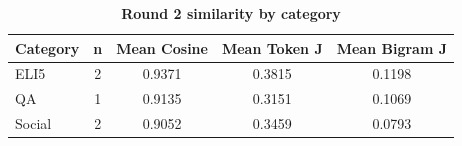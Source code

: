 \begin{table}[htbp]
\centering
\caption{\textbf{Round 2 similarity by category}}
\label{tab:round2-similarity-by-category}
\renewcommand{\arraystretch}{1.4}
\begin{tabular}{|l|c|c|c|c|}
\hline
\textbf{Category} & \textbf{n} & \textbf{Mean Cosine} & \textbf{Mean Token J} & \textbf{Mean Bigram J} \\
\hline
ELI5 & 2 & 0.9371 & 0.3815 & 0.1198 \\
\hline
QA & 1 & 0.9135 & 0.3151 & 0.1069 \\
\hline
Social & 2 & 0.9052 & 0.3459 & 0.0793 \\
\hline
\end{tabular}
\end{table}
